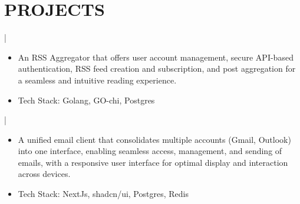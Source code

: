 \documentclass[]{resume}
\begin{document}
\section{PROJECTS}
 | \href{https://github.com/saswatax/rss-aggregator}{\faGithub}
\begin{itemize}
  \item An RSS Aggregator that offers user account management, secure API-based authentication, RSS feed creation and subscription, and post aggregation for a seamless and intuitive reading experience.
  \item Tech Stack: Golang, GO-chi, Postgres
\end{itemize}
 | \href{https://github.com/saswatax/email-client}{\faGithub}
\begin{itemize}
  \item A unified email client that consolidates multiple accounts (Gmail, Outlook) into one interface, enabling seamless access, management, and sending of emails, with a responsive user interface for optimal display and interaction across devices.
  \item Tech Stack: NextJs, shadcn/ui, Postgres, Redis
\end{itemize}
\end{document}
